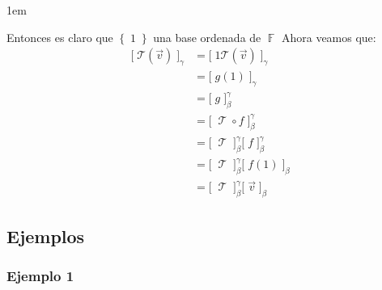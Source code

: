 \documentclass[12pt, fleqn]{report}                             %
\newenvironment{SmallIndentation}[1][0.75em]                    %
        {\begin{adjustwidth}{#1}{}\begin{footnotesize}}             %
        {\end{footnotesize}\end{adjustwidth}}                       %
\theoremstyle{break}                                            %
\DeclareMathOperator \GenericField {\mathbb{F}}                 %
\DeclareMathOperator \LinTrans {\mathcal{T}}                    %
\newcommand{\Set}[1]    {\left\{ \; #1 \; \right\}}             %
\newcommand{\bigBrackets}[1] {\big[ \; #1 \; \big]}             %
\newcommand{\Wrap}[1]    {\left( #1 \right)}                    %
\newcommand{\FnLinTrans}[1]{\mathcal{T}\Wrap{#1}}               %
\begin{document}
\begin{itemize}
\begin{SmallIndentation}[1em]
                            Entonces es claro que $\Set{1}$ una base ordenada de $\GenericField$
                            Ahora veamos que:
                            \begin{align*}
                                \bigBrackets{\FnLinTrans{\vec v}}_\gamma 
                                    &= \bigBrackets{1 \FnLinTrans{\vec v}}_\gamma       \\
                                    &= \bigBrackets{g(1)}_\gamma                        \\
                                    &= \bigBrackets{g}_\beta^\gamma                     \\
                                    &= \bigBrackets{\LinTrans \circ f}_\beta^\gamma     \\
                                    &= \bigBrackets{\LinTrans}_\beta^\gamma
                                        \bigBrackets{f}_\beta^\gamma                    \\
                                    &= \bigBrackets{\LinTrans}_\beta^\gamma
                                        \bigBrackets{f(1)}_\beta                        \\
                                    &= \bigBrackets{\LinTrans}_\beta^\gamma
                                        \bigBrackets{\vec v}_\beta 
                            \end{align*}
                        
                        \end{SmallIndentation}
                            

                    

                \end{itemize}


            \clearpage
            \subsection{Ejemplos}

                \subsubsection{Ejemplo 1}
\end{document}
